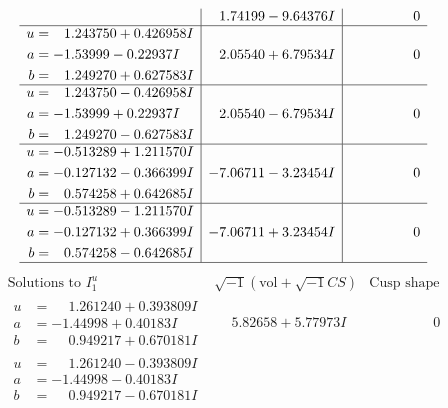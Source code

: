 \documentclass[1p]{elsarticle_modified}
\theoremstyle{definition}
\newcommand{\I}{\sqrt{-1}}
\begin{document}
$$\begin{array}{c|c|c}
 & \phantom{-}1.74199 - 9.64376 I & \phantom{-0.000000 } 0 \\ \hline\begin{aligned}
u &= \phantom{-}1.243750 + 0.426958 I \\
a &= -1.53999 - 0.22937 I \\
b &= \phantom{-}1.249270 + 0.627583 I\end{aligned}
 & \phantom{-}2.05540 + 6.79534 I & \phantom{-0.000000 } 0 \\ \hline\begin{aligned}
u &= \phantom{-}1.243750 - 0.426958 I \\
a &= -1.53999 + 0.22937 I \\
b &= \phantom{-}1.249270 - 0.627583 I\end{aligned}
 & \phantom{-}2.05540 - 6.79534 I & \phantom{-0.000000 } 0 \\ \hline\begin{aligned}
u &= -0.513289 + 1.211570 I \\
a &= -0.127132 - 0.366399 I \\
b &= \phantom{-}0.574258 + 0.642685 I\end{aligned}
 & -7.06711 - 3.23454 I & \phantom{-0.000000 } 0 \\ \hline\begin{aligned}
u &= -0.513289 - 1.211570 I \\
a &= -0.127132 + 0.366399 I \\
b &= \phantom{-}0.574258 - 0.642685 I\end{aligned}
 & -7.06711 + 3.23454 I & \phantom{-0.000000 } 0\\
 \hline 
 \end{array}$$\newpage$$\begin{array}{c|c|c}  
\text{Solutions to }I^u_{1}& \I (\text{vol} + \sqrt{-1}CS) & \text{Cusp shape}\\
 \hline 
\begin{aligned}
u &= \phantom{-}1.261240 + 0.393809 I \\
a &= -1.44998 + 0.40183 I \\
b &= \phantom{-}0.949217 + 0.670181 I\end{aligned}
 & \phantom{-}5.82658 + 5.77973 I & \phantom{-0.000000 } 0 \\ \hline\begin{aligned}
u &= \phantom{-}1.261240 - 0.393809 I \\
a &= -1.44998 - 0.40183 I \\
b &= \phantom{-}0.949217 - 0.670181 I\end{aligned}

\end{array}$$
\end{document}
